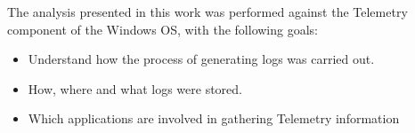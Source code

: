 The analysis presented in this work was performed against the Telemetry component of the Windows OS, with the following goals:
\begin{itemize}
    \item Understand how the process of generating logs was carried out.
    \item How, where and what logs were stored.
    \item Which applications are involved in gathering Telemetry information
\end{itemize}
